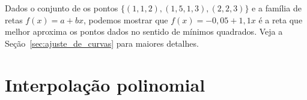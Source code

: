 \begin{ex}
  Dados o conjunto de os pontos $\{(1, 1,2), (1,5, 1,3), (2, 2,3)\}$ e a família de retas $f(x) = a + bx$, podemos mostrar que $f(x) = -0,05 + 1,1x$ é a reta que melhor aproxima os pontos dados no sentido de mínimos quadrados. Veja a Seção~\ref{sec:ajuste_de_curvas} para maiores detalhes.
\end{ex}






\section{Interpolação polinomial}

